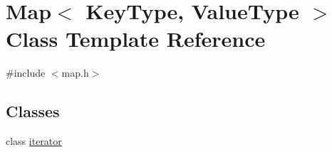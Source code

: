 \hypertarget{classMap}{}\section{Map$<$ Key\+Type, Value\+Type $>$ Class Template Reference}
\label{classMap}


{\ttfamily \#include $<$map.\+h$>$}

\subsection*{Classes}
\begin{DoxyCompactItemize}
\item 
class \mbox{\hyperlink{classMap_1_1iterator}{iterator}}
\end{DoxyCompactItemize}
